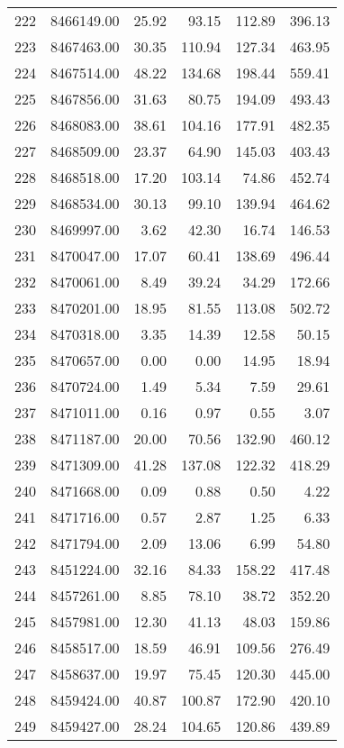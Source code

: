 \begin{table}[ht]
\begin{tabular}{rrrrrr}
  222 & 8466149.00 & 25.92 & 93.15 & 112.89 & 396.13 \\ 
  223 & 8467463.00 & 30.35 & 110.94 & 127.34 & 463.95 \\ 
  224 & 8467514.00 & 48.22 & 134.68 & 198.44 & 559.41 \\ 
  225 & 8467856.00 & 31.63 & 80.75 & 194.09 & 493.43 \\ 
  226 & 8468083.00 & 38.61 & 104.16 & 177.91 & 482.35 \\ 
  227 & 8468509.00 & 23.37 & 64.90 & 145.03 & 403.43 \\ 
  228 & 8468518.00 & 17.20 & 103.14 & 74.86 & 452.74 \\ 
  229 & 8468534.00 & 30.13 & 99.10 & 139.94 & 464.62 \\ 
  230 & 8469997.00 & 3.62 & 42.30 & 16.74 & 146.53 \\ 
  231 & 8470047.00 & 17.07 & 60.41 & 138.69 & 496.44 \\ 
  232 & 8470061.00 & 8.49 & 39.24 & 34.29 & 172.66 \\ 
  233 & 8470201.00 & 18.95 & 81.55 & 113.08 & 502.72 \\ 
  234 & 8470318.00 & 3.35 & 14.39 & 12.58 & 50.15 \\ 
  235 & 8470657.00 & 0.00 & 0.00 & 14.95 & 18.94 \\ 
  236 & 8470724.00 & 1.49 & 5.34 & 7.59 & 29.61 \\ 
  237 & 8471011.00 & 0.16 & 0.97 & 0.55 & 3.07 \\ 
  238 & 8471187.00 & 20.00 & 70.56 & 132.90 & 460.12 \\ 
  239 & 8471309.00 & 41.28 & 137.08 & 122.32 & 418.29 \\ 
  240 & 8471668.00 & 0.09 & 0.88 & 0.50 & 4.22 \\ 
  241 & 8471716.00 & 0.57 & 2.87 & 1.25 & 6.33 \\ 
  242 & 8471794.00 & 2.09 & 13.06 & 6.99 & 54.80 \\ 
  243 & 8451224.00 & 32.16 & 84.33 & 158.22 & 417.48 \\ 
  244 & 8457261.00 & 8.85 & 78.10 & 38.72 & 352.20 \\ 
  245 & 8457981.00 & 12.30 & 41.13 & 48.03 & 159.86 \\ 
  246 & 8458517.00 & 18.59 & 46.91 & 109.56 & 276.49 \\ 
  247 & 8458637.00 & 19.97 & 75.45 & 120.30 & 445.00 \\ 
  248 & 8459424.00 & 40.87 & 100.87 & 172.90 & 420.10 \\ 
  249 & 8459427.00 & 28.24 & 104.65 & 120.86 & 439.89 \\ 

\end{tabular}
\end{table}
